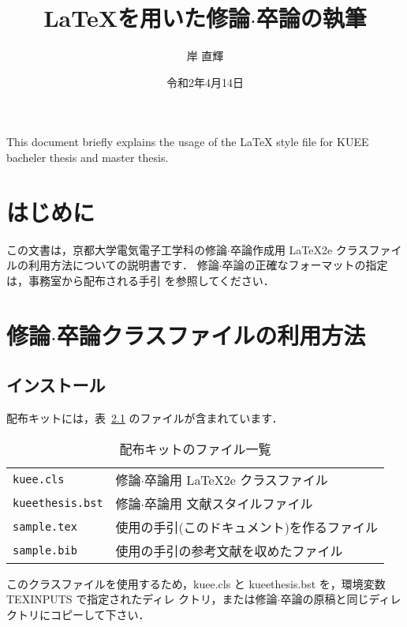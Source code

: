 \documentclass[sotsuron]{kuee}
\title{\LaTeX を用いた修論$\cdot$卒論の執筆}
\author{岸 直輝}
\date{令和2年4月14日}
\begin{document}
\maketitle			%
\begin{eabstract}		%
This document briefly explains the usage of the \LaTeX{} style file
for KUEE bacheler thesis and master thesis.
\end{eabstract}
\tableofcontents		%

\chapter{はじめに}
\label{chap:intro}

この文書は，京都大学電気電子工学科の修論$\cdot$卒論作成用 \LaTeX2e{}
クラスファイルの利用方法についての説明書です．
%
修論$\cdot$卒論の正確なフォーマットの指定は，事務室から配布される手引
を参照してください．


\chapter{修論$\cdot$卒論クラスファイルの利用方法}
\label{chap:usage}

\section{インストール}

配布キットには，表~\ref{tab:kit} のファイルが含まれています．
\begin{table}
  \caption{配布キットのファイル一覧}\label{tab:kit}
  \begin{center}
    \begin{tabular}{ll}
      \verb+kuee.cls+ & 修論$\cdot$卒論用 \LaTeX2e{} クラスファイル \\
      \verb+kueethesis.bst+ & 修論$\cdot$卒論用 \JBibTeX{} 文献スタイルファイル \\
      \verb+sample.tex+ & 使用の手引(このドキュメント)を作るファイル \\
      \verb+sample.bib+ & 使用の手引の参考文献を収めたファイル \\
    \end{tabular}
  \end{center}
\end{table}

このクラスファイルを使用するため，{\ttfamily kuee.cls} と {\ttfamily
kueethesis.bst} を，環境変数 {\ttfamily TEXINPUTS} で指定されたディレ
クトリ，または修論$\cdot$卒論の原稿と同じディレクトリにコピーして下さい．
\end{document}
